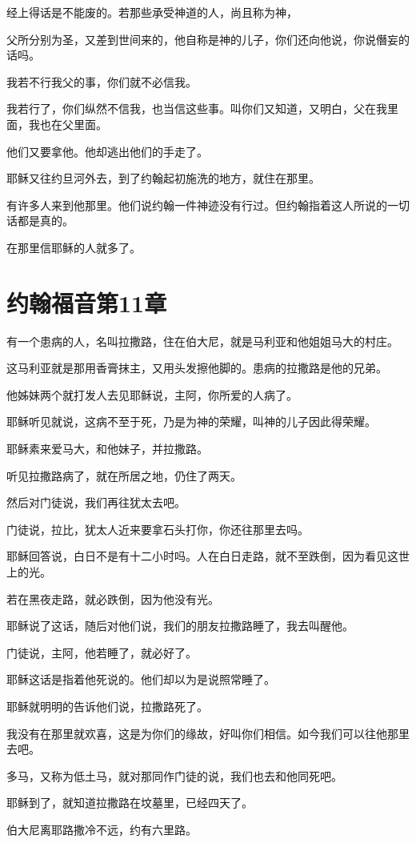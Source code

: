 \documentclass[12pt,oneside]{book}
\begin{document}
经上得话是不能废的。若那些承受神道的人，尚且称为神，

父所分别为圣，又差到世间来的，他自称是神的儿子，你们还向他说，你说僭妄的话吗。

我若不行我父的事，你们就不必信我。

我若行了，你们纵然不信我，也当信这些事。叫你们又知道，又明白，父在我里面，我也在父里面。

他们又要拿他。他却逃出他们的手走了。

耶稣又往约旦河外去，到了约翰起初施洗的地方，就住在那里。

有许多人来到他那里。他们说约翰一件神迹没有行过。但约翰指着这人所说的一切话都是真的。

在那里信耶稣的人就多了。

\chapter{约翰福音第11章}
有一个患病的人，名叫拉撒路，住在伯大尼，就是马利亚和他姐姐马大的村庄。

这马利亚就是那用香膏抹主，又用头发擦他脚的。患病的拉撒路是他的兄弟。

他姊妹两个就打发人去见耶稣说，主阿，你所爱的人病了。

耶稣听见就说，这病不至于死，乃是为神的荣耀，叫神的儿子因此得荣耀。

耶稣素来爱马大，和他妹子，并拉撒路。

听见拉撒路病了，就在所居之地，仍住了两天。

然后对门徒说，我们再往犹太去吧。

门徒说，拉比，犹太人近来要拿石头打你，你还往那里去吗。

耶稣回答说，白日不是有十二小时吗。人在白日走路，就不至跌倒，因为看见这世上的光。

若在黑夜走路，就必跌倒，因为他没有光。

耶稣说了这话，随后对他们说，我们的朋友拉撒路睡了，我去叫醒他。

门徒说，主阿，他若睡了，就必好了。

耶稣这话是指着他死说的。他们却以为是说照常睡了。

耶稣就明明的告诉他们说，拉撒路死了。

我没有在那里就欢喜，这是为你们的缘故，好叫你们相信。如今我们可以往他那里去吧。

多马，又称为低土马，就对那同作门徒的说，我们也去和他同死吧。

耶稣到了，就知道拉撒路在坟墓里，已经四天了。

伯大尼离耶路撒冷不远，约有六里路。
\end{document}
